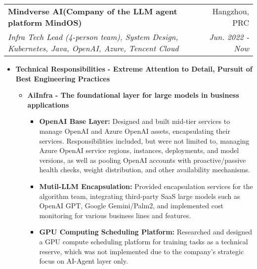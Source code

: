 \documentclass[letterpaper,11pt]{article}
\makeatletter
\newcommand{\resumeSubheading}[4]{
	\vspace{-1pt}\item
	\begin{tabular*}{0.97\textwidth}[t]{l@{\extracolsep{\fill}}r}
		\textbf{#1} & #2 \\
		\textit{\small#3} & \textit{\small #4} \\
	\end{tabular*}\vspace{-5pt}
}
\makeatother
\begin{document}
\begin{spacing}{1.0}
	\resumeSubheading
	{Mindverse AI(Company of the LLM agent platform MindOS)}{Hangzhou, PRC}
	{Infra Tech Lead (4-person team), System Design, Kubernetes, Java, OpenAI, Azure, Tencent Cloud}{Jun. 2022 - Now}
	\begin{itemize}
		\item \textbf{Technical Responsibilities - Extreme Attention to Detail, Pursuit of Best Engineering Practices}
		\begin{itemize}
			\item \textbf{AiInfra - The foundational layer for large models in business applications}
			\begin{itemize}
				\item \textbf{OpenAI Base Layer: }Designed and built mid-tier services to manage OpenAI and Azure OpenAI assets, encapsulating their services. Responsibilities included, but were not limited to, managing Azure OpenAI service regions, instances, deployments, and model versions, as well as pooling OpenAI accounts with proactive/passive health checks, weight distribution, and other availability mechanisms.
				\item \textbf{Mutil-LLM Encapsulation: }Provided encapsulation services for the algorithm team, integrating third-party SaaS large models such as OpenAI GPT, Google Gemini/Palm2, and implemented cost monitoring for various business lines and features.
				\item \textbf{GPU Computing Scheduling Platform: }Researched and designed a GPU compute scheduling platform for training tasks as a technical reserve, which was not implemented due to the company's strategic focus on AI-Agent layer only.
			\end{itemize}
			

\end{itemize}
\end{itemize}
\end{spacing}
\end{document}
